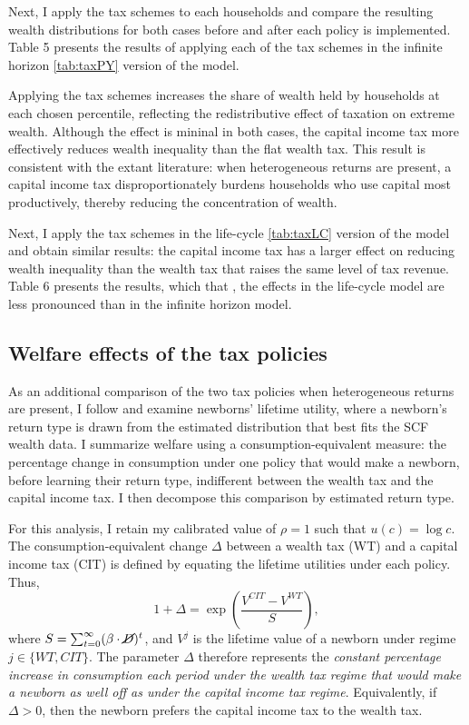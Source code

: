 \par Next, I apply the tax schemes to each households and compare the resulting wealth distributions for both cases before and after each policy is implemented. Table 5 presents the results of applying each of the tax schemes in the infinite horizon \ref{tab:taxPY} version of the model. 
\unskip

\par Applying the tax schemes increases the share of wealth held by households at each chosen percentile, reflecting the redistributive effect of taxation on extreme wealth. Although the effect is mininal in both cases, the capital income tax more effectively reduces wealth inequality than the flat wealth tax. This result is consistent with the extant literature:  when heterogeneous returns are present, a capital income tax disproportionately burdens households who use capital most productively, thereby reducing the concentration of wealth. 

\par Next, I apply the tax schemes in the life-cycle \ref{tab:taxLC} version of the model and obtain similar results: the capital income tax has a larger effect on reducing wealth inequality than the wealth tax that raises the same level of tax revenue. Table 6 presents the results, which that , the effects in the life-cycle model are less pronounced than in the infinite horizon model. 

\unskip

\subsection{Welfare effects of the tax policies}

\par As an additional comparison of the two tax policies when heterogeneous returns are present, I follow \cite{Guvenen2023} and examine newborns' lifetime utility, where a newborn's return type is drawn from the estimated distribution that best fits the SCF wealth data. I summarize welfare using a consumption-equivalent measure: the percentage change in consumption under one policy that would make a newborn, before learning their return type, indifferent between the wealth tax and the capital income tax. I then decompose this comparison by estimated return type.

\par For this analysis, I retain my calibrated value of $\rho =1$ such that $u(c) = \log c$. The consumption-equivalent change $\Delta$ between a wealth tax (WT) and a capital income tax (CIT) is defined by equating the lifetime utilities under each policy. Thus,
$$
1 + \Delta = \exp\left( \frac{V^{CIT} - V^{WT}}{S} \right),
$$
where $S = \sum_{t=0}^{\infty} (\beta \cdot \cancel{D})^{t}$, and $V^{j}$ is the lifetime value of a newborn under regime $j \in \{WT, CIT\}$. The parameter $\Delta$ therefore represents the \textit{constant percentage increase in consumption each period under the wealth tax regime that would make a newborn as well off as under the capital income tax regime}. Equivalently, if $\Delta > 0$, then the newborn prefers the capital income tax to the wealth tax.
 
